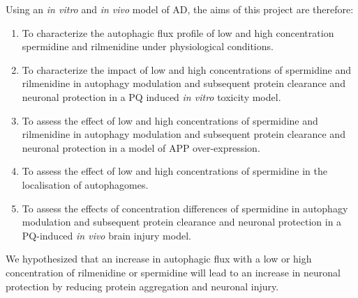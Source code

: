Using an \textit{in vitro} and \textit{in vivo} model of AD, the aims of this project are therefore: 
\begin{enumerate}

\item To characterize the autophagic flux profile of low and high concentration spermidine and rilmenidine under physiological conditions.
\item To characterize the impact of low and high concentrations of spermidine and rilmenidine in autophagy modulation and subsequent protein clearance and neuronal protection in a PQ induced \textit{in vitro} toxicity model. 
\item To assess the effect of low and high concentrations of spermidine and rilmenidine in autophagy modulation and subsequent protein clearance and neuronal protection in a model of APP over-expression. 
\item To assess the effect of low and high concentrations of spermidine in the localisation of autophagomes.
\item To assess the effects of concentration differences of spermidine in autophagy modulation and subsequent protein clearance and neuronal protection in a PQ-induced \textit{in vivo} brain injury model. 
\end{enumerate}

We hypothesized that an increase in autophagic flux with a low or high concentration of rilmenidine or spermidine will lead to an increase in neuronal protection by reducing protein aggregation and neuronal injury.


